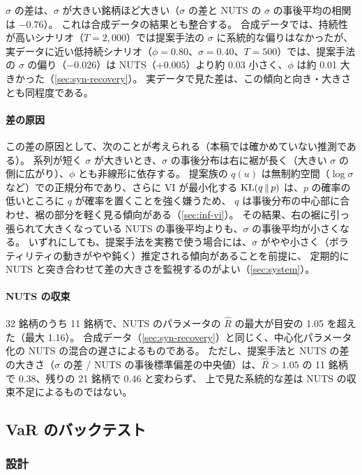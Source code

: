 $\sigma$ の差は、$\sigma$ が大きい銘柄ほど大きい（$\sigma$ の差と NUTS の $\sigma$ の事後平均の相関は $-0.76$）。
これは合成データの結果とも整合する。
合成データでは、持続性が高いシナリオ（$T = 2{,}000$）では提案手法の $\sigma$ に系統的な偏りはなかったが、
実データに近い低持続シナリオ（$\phi = 0.80$、$\sigma = 0.40$、$T = 500$）では、提案手法の $\sigma$ の偏り（$-0.026$）は NUTS（$+0.005$）より約 0.03 小さく、$\phi$ は約 0.01 大きかった（\cref{sec:syn-recovery}）。
実データで見た差は、この傾向と向き・大きさとも同程度である。

\paragraph{差の原因}
この差の原因として、次のことが考えられる（本稿では確かめていない推測である）。
系列が短く $\sigma$ が大きいとき、$\sigma$ の事後分布は右に裾が長く（大きい $\sigma$ の側に広がり）、$\phi$ とも非線形に依存する。
提案族の $q(u)$ は無制約空間（$\log\sigma$ など）での正規分布であり、さらに VI が最小化する $\mathrm{KL}(q \,\|\, p)$ は、$p$ の確率の低いところに $q$ が確率を置くことを強く嫌うため、
$q$ は事後分布の中心部に合わせ、裾の部分を軽く見る傾向がある（\cref{sec:inf-vi}）。
その結果、右の裾に引っ張られて大きくなっている NUTS の事後平均よりも、$\sigma$ の事後平均が小さくなる。
いずれにしても、提案手法を実務で使う場合には、$\sigma$ がやや小さく（ボラティリティの動きがやや鈍く）推定される傾向があることを前提に、
定期的に NUTS と突き合わせて差の大きさを監視するのがよい（\cref{sec:system}）。

\paragraph{NUTS の収束}
32 銘柄のうち 11 銘柄で、NUTS のパラメータの $\hat R$ の最大が目安の 1.05 を超えた（最大 1.16）。
合成データ（\cref{sec:syn-recovery}）と同じく、中心化パラメータ化の NUTS の混合の遅さによるものである。
ただし、提案手法と NUTS の差の大きさ（$\sigma$ の差 / NUTS の事後標準偏差の中央値）は、$\hat R > 1.05$ の 11 銘柄で 0.38、残りの 21 銘柄で 0.46 と変わらず、
上で見た系統的な差は NUTS の収束不足によるものではない。

\subsection{VaR のバックテスト}\label{sec:emp-var}

\subsubsection{設計}

